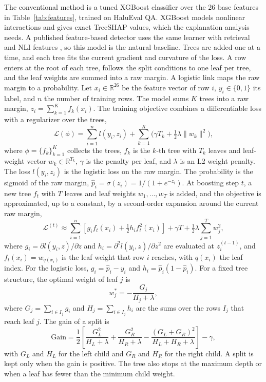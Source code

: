 \documentclass[a4paper,fleqn]{cas-sc}
\begin{document}
The conventional method is a tuned XGBoost classifier \cite{xgboost} over the 26 base features in Table~\ref{tab:features}, trained on HaluEval QA. XGBoost models nonlinear interactions and gives exact TreeSHAP values, which the explanation analysis needs. A published feature-based detector uses the same learner with retrieval and NLI features \cite{ijert}, so this model is the natural baseline. Trees are added one at a time, and each tree fits the current gradient and curvature of the loss. A row enters at the root of each tree, follows the split conditions to one leaf per tree, and the leaf weights are summed into a raw margin. A logistic link maps the raw margin to a probability. Let $x_i \in \mathbb{R}^{26}$ be the feature vector of row $i$, $y_i \in \{0,1\}$ its label, and $n$ the number of training rows. The model sums $K$ trees into a raw margin, $z_i = \sum_{k=1}^{K} f_k(x_i)$. The training objective combines a differentiable loss with a regularizer over the trees,
\begin{equation}
  \mathcal{L}(\phi) = \sum_{i=1}^{n} l(y_i, z_i) + \sum_{k=1}^{K} \big( \gamma T_k + \tfrac{1}{2}\lambda \lVert w_k \rVert^2 \big),
\end{equation}
where $\phi = \{f_k\}_{k=1}^{K}$ collects the trees, $f_k$ is the $k$-th tree with $T_k$ leaves and leaf-weight vector $w_k \in \mathbb{R}^{T_k}$, $\gamma$ is the penalty per leaf, and $\lambda$ is an L2 weight penalty. The loss $l(y_i,z_i)$ is the logistic loss on the raw margin. The probability is the sigmoid of the raw margin, $\hat{p}_i = \sigma(z_i) = 1/(1 + e^{-z_i})$. At boosting step $t$, a new tree $f_t$ with $T$ leaves and leaf weights $w_1,\dots,w_T$ is added, and the objective is approximated, up to a constant, by a second-order expansion around the current raw margin,
\begin{equation}
  \mathcal{L}^{(t)} \approx \sum_{i=1}^{n} \left[ g_i f_t(x_i) + \tfrac{1}{2} h_i f_t^2(x_i) \right] + \gamma T + \tfrac{1}{2}\lambda \sum_{j=1}^{T} w_j^2,
\end{equation}
where $g_i = \partial l(y_i,z)/\partial z$ and $h_i = \partial^2 l(y_i,z)/\partial z^2$ are evaluated at $z_i^{(t-1)}$, and $f_t(x_i) = w_{q(x_i)}$ is the leaf weight that row $i$ reaches, with $q(x_i)$ the leaf index. For the logistic loss, $g_i = \hat{p}_i - y_i$ and $h_i = \hat{p}_i(1-\hat{p}_i)$. For a fixed tree structure, the optimal weight of leaf $j$ is
\begin{equation}
  w_j^{*} = -\frac{G_j}{H_j + \lambda},
\end{equation}
where $G_j = \sum_{i \in I_j} g_i$ and $H_j = \sum_{i \in I_j} h_i$ are the sums over the rows $I_j$ that reach leaf $j$. The gain of a split is
\begin{equation}
  \mathrm{Gain} = \frac{1}{2}\left[ \frac{G_L^2}{H_L+\lambda} + \frac{G_R^2}{H_R+\lambda} - \frac{(G_L+G_R)^2}{H_L+H_R+\lambda} \right] - \gamma,
\end{equation}
with $G_L$ and $H_L$ for the left child and $G_R$ and $H_R$ for the right child. A split is kept only when the gain is positive. The tree also stops at the maximum depth or when a leaf has fewer than the minimum child weight.
\end{document}
